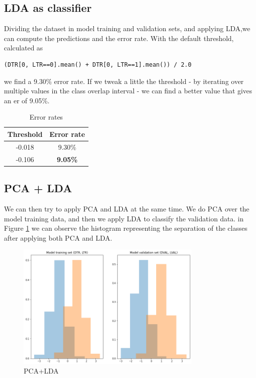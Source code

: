 \documentclass[12pt, a4paper]{article}
\begin{document}
\subsection{LDA as classifier}

Dividing the dataset in model training and validation sets, and applying LDA,we can compute the predictions and the error rate. With the default threshold, calculated as

\begin{lstlisting}[xleftmargin=.1\textwidth]
(DTR[0, LTR==0].mean() + DTR[0, LTR==1].mean()) / 2.0
\end{lstlisting}

\noindent we find a 9.30\% error rate. If we tweak a little the threshold - by iterating over multiple values in the class overlap interval - we can find a better value that gives an er of 9.05\%.

\begin{table}[ht!]
	\centering
 	\begin{tabular}{| | c c | |} 
 		\hline
		Threshold & Error rate\\
		\hline\hline
		-0.018 & 9.30\%\\
		\hline
		-0.106 & \textbf{9.05\%}\\
		\hline
	\end{tabular}
	\caption{Error rates}
\end{table}

\subsection{PCA + LDA}

We can then try to apply PCA and LDA at the same time. We do PCA over the model training data, and then we apply LDA to classify the validation data. in Figure \ref{fig:PCA+LDA} we can observe the histogram representing the separation of the classes after applying both PCA and LDA.

\begin{figure}[ht]
	\centering
	\includegraphics[width=0.8\textwidth]{PCA+LDA}
	\caption{PCA+LDA}
	\label{fig:PCA+LDA}
\end{figure}
\end{document}

